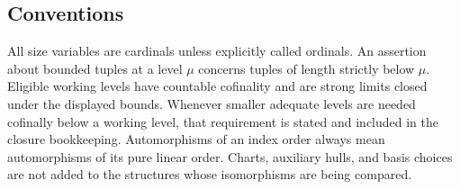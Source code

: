 \subsection{Conventions}

All size variables are cardinals unless explicitly called ordinals.
An assertion about bounded tuples at a level $\mu$ concerns tuples of
length strictly below $\mu$. Eligible working levels have countable
cofinality and are strong limits closed under the displayed bounds.
Whenever smaller adequate levels are needed cofinally below a working
level, that requirement is stated and included in the closure bookkeeping.
Automorphisms of an index order always mean automorphisms of its pure
linear order. Charts, auxiliary hulls, and basis choices are not added to
the structures whose isomorphisms are being compared.
